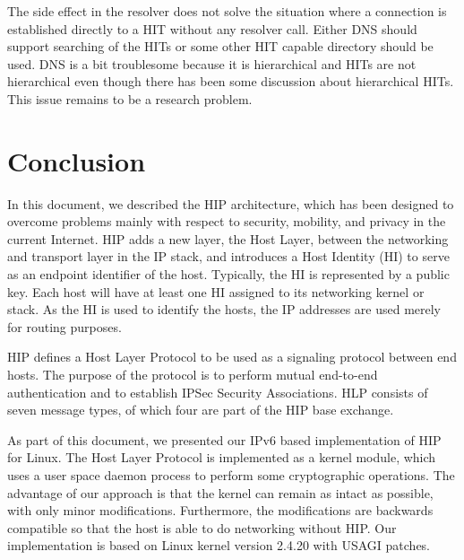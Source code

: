 The side effect in the resolver does not solve the situation where a
connection is established directly to a HIT without any resolver
call. Either DNS should support searching of the HITs or some other
HIT capable directory should be used. DNS is a bit troublesome because
it is hierarchical and HITs are not hierarchical even though there has
been some discussion about hierarchical HITs. This issue remains to be
a research problem.

\section{Conclusion}
\label{sec:conclusion}

In this document, we described the HIP architecture, which has been
designed to overcome problems mainly with respect to security,
mobility, and privacy in the current Internet. HIP adds a new layer,
the Host Layer, between the networking and transport layer in the IP
stack, and introduces a Host Identity (HI) to serve as an endpoint
identifier of the host. Typically, the HI is represented by a public
key. Each host will have at least one HI assigned to its networking
kernel or stack. As the HI is used to identify the hosts, the IP
addresses are used merely for routing purposes.

HIP defines a Host Layer Protocol to be used as a signaling protocol
between end hosts. The purpose of the protocol is to perform mutual
end-to-end authentication and to establish IPSec Security
Associations. HLP consists of seven message types, of which four are
part of the HIP base exchange.

As part of this document, we presented our IPv6 based implementation
of HIP for Linux. The Host Layer Protocol is implemented as a kernel
module, which uses a user space daemon process to perform some
cryptographic operations. The advantage of our approach is that the
kernel can remain as intact as possible, with only minor
modifications. Furthermore, the modifications are backwards compatible
so that the host is able to do networking without HIP. Our
implementation is based on Linux kernel version 2.4.20 with USAGI
patches.
